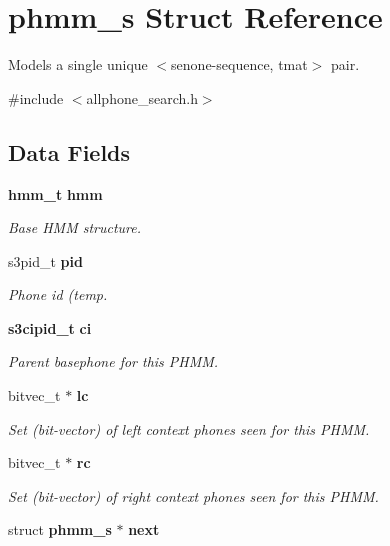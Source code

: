 \section{phmm\+\_\+s Struct Reference}
\label{structphmm__s}


Models a single unique $<$senone-\/sequence, tmat$>$ pair.  




{\ttfamily \#include $<$allphone\+\_\+search.\+h$>$}

\subsection*{Data Fields}
\begin{DoxyCompactItemize}
\item 
{\bf hmm\+\_\+t} {\bf hmm}\label{structphmm__s_a829311265f8df700c9fb628f5bdff0ad}

\begin{DoxyCompactList}\small\item\em Base H\+M\+M structure. \end{DoxyCompactList}\item 
s3pid\+\_\+t {\bf pid}
\begin{DoxyCompactList}\small\item\em Phone id (temp. \end{DoxyCompactList}\item 
{\bf s3cipid\+\_\+t} {\bf ci}\label{structphmm__s_afe385b65ca02fb4e3a087a0997ea4eac}

\begin{DoxyCompactList}\small\item\em Parent basephone for this P\+H\+M\+M. \end{DoxyCompactList}\item 
bitvec\+\_\+t $\ast$ {\bf lc}\label{structphmm__s_aad9f810256dea9ee491d21eb3a349d1c}

\begin{DoxyCompactList}\small\item\em Set (bit-\/vector) of left context phones seen for this P\+H\+M\+M. \end{DoxyCompactList}\item 
bitvec\+\_\+t $\ast$ {\bf rc}\label{structphmm__s_a94ead49959a95398643178d8dc1609f8}

\begin{DoxyCompactList}\small\item\em Set (bit-\/vector) of right context phones seen for this P\+H\+M\+M. \end{DoxyCompactList}\item 
struct {\bf phmm\+\_\+s} $\ast$ {\bf next}\label{structphmm__s_a62c94d334abbbd2431d5e7e0ace79a14}


\end{DoxyCompactItemize}
